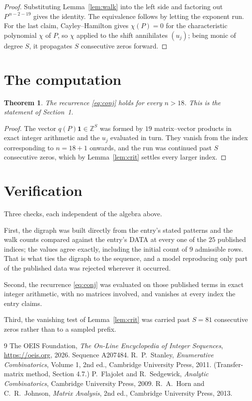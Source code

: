 \documentclass[11pt,a4paper]{article}
\theoremstyle{plain}
\newtheorem{theorem}{Theorem}
\theoremstyle{definition}
\begin{document}
\begin{proof}
Substituting Lemma~\ref{lem:walk} into the left side and factoring out
$P^{\,n-2-19}$ gives the identity. The equivalence follows by letting the exponent
run. For the last claim, Cayley--Hamilton gives $\chi(P)=0$ for the characteristic
polynomial $\chi$ of $P$, so $\chi$ applied to the shift annihilates $(u_j)$; being monic of
degree $S$, it propagates $S$ consecutive zeros forward.
\end{proof}

\section{The computation}

\begin{theorem}
The recurrence \eqref{eq:conj} holds for every $n>18$. This is the statement of
Section~1.
\end{theorem}

\begin{proof}
The vector $q(P)\mathbf{1}\in\mathbb{Z}^{S}$ was formed by $19$ matrix--vector
products in exact integer arithmetic and the $u_j$ evaluated in turn. They vanish from the
index corresponding to $n=18+1$ onwards, and the run was continued past $S$ consecutive
zeros, which by Lemma~\ref{lem:crit} settles every larger index.
\end{proof}

\section{Verification}

Three checks, each independent of the algebra above.

First, the digraph was built directly from the entry's stated patterns and the walk counts
compared against the entry's DATA at every one of the $25$ published indices; the
values agree exactly, including the initial count of $9$ admissible rows. That is
what ties the digraph to the sequence, and a model reproducing only part of the published
data was rejected wherever it occurred.

Second, the recurrence \eqref{eq:conj} was evaluated on those published terms in exact
integer arithmetic, with no matrices involved, and vanishes at every index the entry claims.

Third, the vanishing test of Lemma~\ref{lem:crit} was carried past $S=81$ consecutive
zeros rather than to a sampled prefix.

\begin{thebibliography}{9}
 The OEIS Foundation, \emph{The On-Line Encyclopedia of Integer
Sequences}, \url{https://oeis.org}, 2026. Sequence A207484.
 R.~P.~Stanley, \emph{Enumerative Combinatorics}, Volume 1, 2nd ed.,
Cambridge University Press, 2011. (Transfer-matrix method, Section 4.7.)
 P.~Flajolet and R.~Sedgewick, \emph{Analytic Combinatorics}, Cambridge
University Press, 2009.
 R.~A.~Horn and C.~R.~Johnson, \emph{Matrix Analysis}, 2nd ed., Cambridge
University Press, 2013.
\end{thebibliography}
\end{document}
